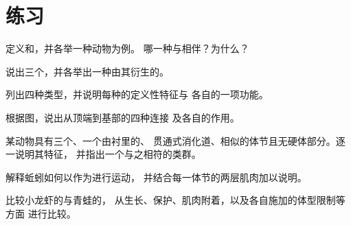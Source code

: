 \section{练习}

\begin{exercise}[$\star$]\label{exo:b1:body-plans-tissues:1}
定义和，并各举一种动物为例。
哪一种与相伴？为什么？
\end{exercise}

\begin{exercise}[$\star$]\label{exo:b1:body-plans-tissues:2}
说出三个，并各举出一种由其衍生的。
\end{exercise}

\begin{exercise}[$\star$]\label{exo:b1:body-plans-tissues:3}
列出四种类型，并说明每种的定义性特征与
各自的一项功能。
\end{exercise}

\begin{exercise}[$\star$]\label{exo:b1:body-plans-tissues:4}
根据图，说出从顶端到基部的四种连接
及各自的作用。
\end{exercise}

\begin{exercise}[$\star\star$]\label{exo:b1:body-plans-tissues:5}
某动物具有三个、一个由衬里的、
贯通式消化道、相似的体节且无硬体部分。逐一说明其特征，
并指出一个与之相符的类群。
\end{exercise}

\begin{exercise}[$\star\star$]\label{exo:b1:body-plans-tissues:6}
解释蚯蚓如何以作为进行运动，
并结合每一体节的两层肌肉加以说明。
\end{exercise}

\begin{exercise}[$\star\star$]\label{exo:b1:body-plans-tissues:7}
比较小龙虾的与青蛙的，
从生长、保护、肌肉附着，以及各自施加的体型限制等方面
进行比较。
\end{exercise}

